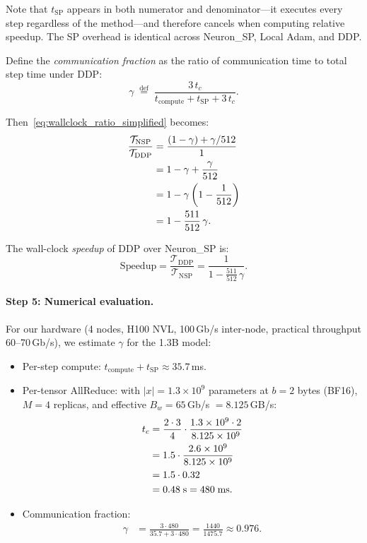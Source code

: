 \documentclass{article}
\begin{document}
Note that $t_{\text{SP}}$ appears in both numerator and denominator---it
executes every step regardless of the method---and therefore cancels
when computing relative speedup. The SP overhead is identical across
Neuron\_SP, Local Adam, and DDP.

Define the \emph{communication fraction} as the ratio of communication
time to total step time under DDP:
\begin{equation}
\gamma \;\stackrel{\text{def}}{=}\;
\frac{3\,t_c}{t_{\text{compute}} + t_{\text{SP}} + 3\,t_c}.
\label{eq:gamma_def}
\end{equation}

Then~\eqref{eq:wallclock_ratio_simplified} becomes:
\begin{align}
\frac{\mathcal{T}_{\text{NSP}}}{\mathcal{T}_{\text{DDP}}}
&= \frac{(1-\gamma) + \gamma/512}{1}
\notag \\
&= 1 - \gamma + \frac{\gamma}{512}
\notag \\
&= 1 - \gamma\left(1 - \frac{1}{512}\right)
\notag \\
&= 1 - \frac{511}{512}\,\gamma.
\label{eq:wallclock_gamma}
\end{align}

The wall-clock \emph{speedup} of DDP over Neuron\_SP is:
\begin{equation}
\text{Speedup} = \frac{\mathcal{T}_{\text{DDP}}}{\mathcal{T}_{\text{NSP}}}
= \frac{1}{1 - \frac{511}{512}\,\gamma}.
\label{eq:speedup_general}
\end{equation}

\paragraph{Step 5: Numerical evaluation.}

For our hardware (4 nodes, H100 NVL, 100\,Gb/s inter-node, practical
throughput 60--70\,Gb/s), we estimate $\gamma$ for the 1.3B model:

\begin{itemize}
\item Per-step compute: $t_{\text{compute}} + t_{\text{SP}} \approx 35.7$\,ms.
\item Per-tensor AllReduce: with $|x| = 1.3 \times 10^9$ parameters at
  $b = 2$ bytes (BF16), $M = 4$ replicas, and effective $B_w = 65$\,Gb/s
  $= 8.125$\,GB/s:
\begin{align}
t_c
&= \frac{2 \cdot 3}{4} \cdot \frac{1.3 \times 10^9 \cdot 2}{8.125 \times 10^9}
\notag \\
&= 1.5 \cdot \frac{2.6 \times 10^9}{8.125 \times 10^9}
\notag \\
&= 1.5 \cdot 0.32
\notag \\
&= 0.48\;\text{s}
= 480\;\text{ms}.
\label{eq:tc_concrete}
\end{align}
\item Communication fraction:
\begin{align}
\gamma
&= \frac{3 \cdot 480}{35.7 + 3 \cdot 480}
= \frac{1440}{1475.7}
\approx 0.976.
\label{eq:gamma_concrete}
\end{align}
\end{itemize}
\end{document}
